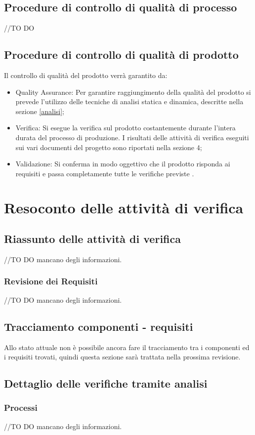 \documentclass[12pt,a4paper]{article}
\begin{document}
\subsection{Procedure di controllo di qualità di processo}
//TO DO \IB
\subsection{Procedure di controllo di qualità di prodotto}
Il controllo di qualità del prodotto verrà garantito da:
\begin{itemize}
\item Quality Assurance: Per garantire raggiungimento della qualità del prodotto  si  prevede l'utilizzo delle tecniche di analisi statica e dinamica, descritte nella sezione \ref{analisi};
\item Verifica: Si esegue la verifica sul prodotto costantemente durante l'intera durata del processo di produzione. I risultati delle attività di verifica eseguiti sui vari documenti del progetto sono riportati nella sezione 4;
\item Validazione: Si conferma in modo oggettivo che il prodotto risponda ai requisiti e passa completamente tutte le verifiche previste .
\end{itemize}
\newpage
\section{ Resoconto delle attività di verifica}
\subsection{Riassunto delle attività di verifica}
//TO DO \IB mancano degli informazioni.
\subsubsection{Revisione dei Requisiti}
//TO DO \IB mancano degli informazioni.
\subsection{Tracciamento componenti - requisiti}
Allo stato attuale non è possibile ancora fare il tracciamento tra i componenti ed i requisiti trovati, quindi questa sezione sarà trattata nella prossima revisione.
\subsection{Dettaglio delle verifiche tramite analisi}
\subsubsection{Processi}
//TO DO \IB mancano degli informazioni.
\end{document}
